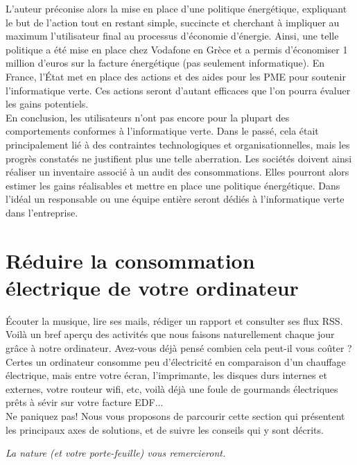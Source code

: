 \documentclass[a4paper,11pt,french]{article}
\begin{document}
L’auteur préconise alors la mise en place d’une politique énergétique, expliquant le but de l’action tout en restant simple, succincte et cherchant à impliquer au maximum l’utilisateur final au processus d’économie d’énergie. Ainsi, une telle politique a été mise en place chez Vodafone en Grèce et a permis d’économiser 1 million d’euros sur la facture énergétique (pas seulement informatique). En France, l’État met en place des actions et des aides pour les PME pour soutenir l’informatique verte. Ces actions seront d’autant efficaces que l’on pourra évaluer les gains potentiels.\\

En conclusion, les utilisateurs n’ont pas encore pour la plupart des comportements conformes à l’informatique verte. Dans le passé, cela était principalement lié à des contraintes technologiques et organisationnelles, mais les progrès constatés ne justifient plus une telle aberration. Les sociétés doivent ainsi réaliser un inventaire associé à un audit des consommations. Elles pourront alors estimer les gains réalisables et mettre en place une politique énergétique. Dans l’idéal un responsable ou une équipe entière seront dédiés à l’informatique verte dans l’entreprise.\\



\section[Réduire sa consommation]{Réduire la consommation électrique de votre ordinateur}

Écouter la musique, lire ses mails, rédiger un rapport et consulter ses flux RSS. Voilà un bref aperçu des activités que nous faisons naturellement chaque jour grâce à notre ordinateur. Avez-vous déjà pensé combien cela peut-il vous coûter ?
Certes un ordinateur consomme peu d'électricité en comparaison d'un chauffage électrique, mais entre votre écran, l'imprimante, les disques durs internes et externes, votre routeur wifi, etc, voilà déjà une foule de gourmands électriques prêts à sévir sur votre facture EDF...\\

Ne paniquez pas! Nous vous proposons de parcourir cette section qui présentent les principaux axes de solutions, et de suivre les conseils qui y sont décrits.\\
\begin{center}
\emph{La nature (et votre porte-feuille) vous remercieront.}
\end{center}
\end{document}
